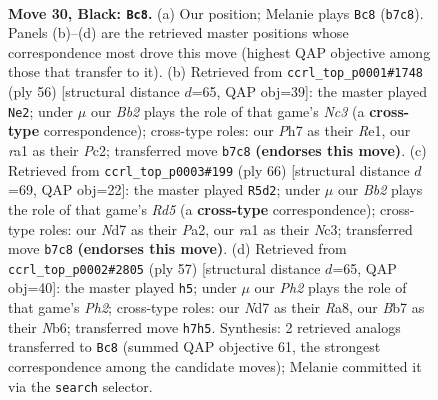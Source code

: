 \documentclass[11pt]{article}
\begin{document}
\clearpage

\begin{figure}[p]\centering
\begin{subfigure}{0.46\textwidth}\centering
\resizebox{\linewidth}{!}{%
\newchessgame
\chessboard[
  setfen={6k1/1b1n1p1p/5rp1/3Pp3/1p2P3/1r3PP1/4K2P/R5NR b - - 3 30},
  showmover=false,
  pgfstyle=straightmove, color=movearrow, markmove={b7-c8}
]}
\caption{}
\end{subfigure}\hfill
\begin{subfigure}{0.46\textwidth}\centering
\resizebox{\linewidth}{!}{%
\newchessgame
\chessboard[
  setfen={6r1/p2r1p1p/2knp3/3p4/R5P1/PPN4P/2P5/2K1R3 w - - 5 29},
  showmover=false,
  pgfstyle=straightmove, color=movearrow, markmove={c3-e2}
]}
\caption{}
\end{subfigure}
\\[4pt]
\begin{subfigure}{0.46\textwidth}\centering
\resizebox{\linewidth}{!}{%
\newchessgame
\chessboard[
  setfen={8/2k2r2/ppn1r2p/2pR1pp1/8/1PN2PPP/P3PK2/3R4 w - - 1 34},
  showmover=false,
  pgfstyle=straightmove, color=movearrow, markmove={d5-d2}
]}
\caption{}
\end{subfigure}\hfill
\begin{subfigure}{0.46\textwidth}\centering
\resizebox{\linewidth}{!}{%
\newchessgame
\chessboard[
  setfen={r4k2/p4p1p/1n2prp1/2p5/2P3P1/1P2RP2/P3N2P/2KR4 b - - 0 29},
  showmover=false,
  pgfstyle=straightmove, color=movearrow, markmove={h7-h5}
]}
\caption{}
\end{subfigure}
\caption{\textbf{Move 30, Black: \texttt{Bc8}.} (a) Our position; Melanie plays \texttt{Bc8} (\texttt{b7c8}). Panels (b)--(d) are the retrieved master positions whose correspondence most drove this move (highest QAP objective among those that transfer to it). (b) Retrieved from \texttt{ccrl\_top\_p0001\#1748} (ply 56) [structural distance $d$=65, QAP obj=39]: the master played \texttt{Ne2}; under $\mu$ our \emph{Bb2} plays the role of that game's \emph{Nc3} (a \textbf{cross-type} correspondence); cross-type roles: our \emph{P}h7 as their \emph{R}e1, our \emph{r}a1 as their \emph{P}c2; transferred move \texttt{b7c8} \textbf{(endorses this move)}. (c) Retrieved from \texttt{ccrl\_top\_p0003\#199} (ply 66) [structural distance $d$=69, QAP obj=22]: the master played \texttt{R5d2}; under $\mu$ our \emph{Bb2} plays the role of that game's \emph{Rd5} (a \textbf{cross-type} correspondence); cross-type roles: our \emph{N}d7 as their \emph{P}a2, our \emph{r}a1 as their \emph{N}c3; transferred move \texttt{b7c8} \textbf{(endorses this move)}. (d) Retrieved from \texttt{ccrl\_top\_p0002\#2805} (ply 57) [structural distance $d$=65, QAP obj=40]: the master played \texttt{h5}; under $\mu$ our \emph{Ph2} plays the role of that game's \emph{Ph2}; cross-type roles: our \emph{N}d7 as their \emph{R}a8, our \emph{B}b7 as their \emph{N}b6; transferred move \texttt{h7h5}. Synthesis: 2 retrieved analogs transferred to \texttt{Bc8} (summed QAP objective 61, the strongest correspondence among the candidate moves); Melanie committed it via the \texttt{search} selector.}
\label{fig:thought-m59}
\end{figure}
\end{document}
